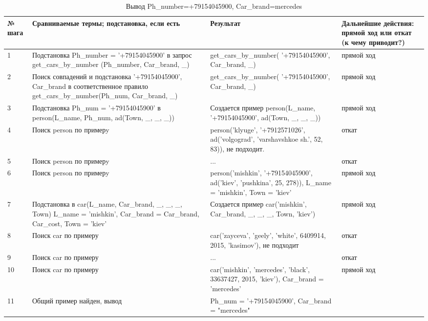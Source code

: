 \begin{table}
	\caption{Вывод Ph\_number=+79154045900, Car\_brand=mercedes }
	\begin{tabular}{|p{1cm}|p{5cm}|p{5cm}|p{5cm}|}
		\hline
		№ шага & Сравниваемые термы; подстановка, если есть & Результат & Дальнейшие действия: прямой ход или откат (к чему приводит?) \\
		\hline
		1 & Подстановка Ph\_number = '+79154045900' в запрос get\_cars\_by\_number (Ph\_number, Car\_brand, \_) & get\_cars\_by\_number( '+79154045900', Car\_brand, \_) & прямой ход \\
		\hline
		2 & Поиск совпадений и подстановка '+79154045900', Car\_brand в соответственное правило  get\_cars\_by\_number(Ph\_num, Car\_brand, \_) & get\_cars\_by\_number( '+79154045900', Car\_brand, \_) & прямой ход \\
		\hline
		3 & Подстановка Ph\_num = '+79154045900' в person(L\_name, Ph\_num, ad(Town, \_, \_, \_)) & Создается пример person(L\_name, '+79154045900', ad(Town, \_, \_, \_)) & прямой ход \\
		\hline
		4 & Поиск person по примерy & person('klyuge', '+7912571026', ad('volgograd', 'varshavshkoe sh.', 52, 83)), не подходит. & откат \\
		\hline
		5 & Поиск person по примерy & ... & откат \\
		\hline
		6 & Поиск person по примерy & person('mishkin',  '+79154045900', ad('kiev', 'pushkina', 25, 278)), L\_name = 'mishkin', Town = 'kiev' & прямой ход \\
		\hline
		7 & Подстановка в car(L\_name, Car\_brand, \_, \_, \_, Town) L\_name = 'mishkin', Car\_brand = Car\_brand, Car\_cost, Town = 'kiev' & Создается пример car('mishkin', Car\_brand, \_, \_, \_, Town, 'kiev') & прямой ход \\
		\hline
		8 & Поиск car по примеру & car('zayceva', 'geely', 'white', 6409914, 2015, 'kasimov'), не подходит & откат \\
		\hline
		9 & Поиск car по примеру & ... & откат \\
		\hline
		10 & Поиск car по примеру & car('mishkin', 'mercedes', 'black', 33637427, 2015, 'kiev'), Car\_brand = 'mercedes' & прямой ход \\
		\hline
		11 & Общий пример найден, вывод & Ph\_num = '+79154045900', Car\_brand = "mercedes" &  \\
		\hline
	\end{tabular}
\end{table}
